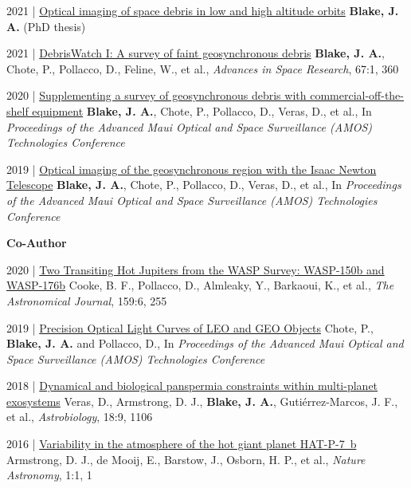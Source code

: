 \documentclass[10pt,a4paper]{altacv}
\begin{document}
\smallskip

\small
2021 | \href{https://www.researchgate.net/publication/355472603_Optical_imaging_of_space_debris_in_low_and_high_altitude_orbits}{Optical imaging of space debris in low and high altitude orbits}
\textbf{Blake, J. A.} (PhD thesis)

\smallskip

\small
2021 | \href{https://www.sciencedirect.com/science/article/abs/pii/S0273117720305664}{DebrisWatch I: A survey of faint geosynchronous debris}
\textbf{Blake, J. A.}, Chote, P., Pollacco, D., Feline, W., et al., \textit{Advances in Space Research}, 67:1, 360

\smallskip

\small
2020 | \href{https://www.researchgate.net/publication/344329639_Supplementing_a_survey_of_geosynchronous_debris_with_commercial-off-the-shelf_equipment}{Supplementing a survey of geosynchronous debris with commercial-off-the-shelf equipment}
\textbf{Blake, J. A.}, Chote, P., Pollacco, D., Veras, D., et al., In \textit{Proceedings of the Advanced Maui Optical and Space Surveillance (AMOS) Technologies Conference}

\smallskip

\small
2019 | \href{https://www.researchgate.net/publication/338337216_Optical_imaging_of_faint_geosynchronous_debris_with_the_Isaac_Newton_Telescope}{Optical imaging of the geosynchronous region with the Isaac Newton Telescope}
\textbf{Blake, J. A.}, Chote, P., Pollacco, D., Veras, D., et al., In \textit{Proceedings of the Advanced Maui Optical and Space Surveillance (AMOS) Technologies Conference}

\divider

\normalsize \textbf{Co-Author} 

\medskip

\small
2020 | \href{https://iopscience.iop.org/article/10.3847/1538-3881/ab88db/meta}{Two Transiting Hot Jupiters from the WASP Survey: WASP-150b and WASP-176b}
Cooke, B. F., Pollacco, D., Almleaky, Y., Barkaoui, K., et al., \textit{The Astronomical Journal}, 159:6, 255

\smallskip 

\small
2019 | \href{https://www.researchgate.net/publication/338450520_Precision_Optical_Light_Curves_of_LEO_and_GEO_Objects}{Precision Optical Light Curves of LEO and GEO Objects}
Chote, P., \linebreak\textbf{Blake, J. A.} and Pollacco, D., In \textit{Proceedings of the Advanced Maui Optical and Space Surveillance (AMOS) Technologies Conference}

\smallskip

\small
2018 | \href{https://www.liebertpub.com/doi/abs/10.1089/ast.2017.1786}{Dynamical and biological panspermia constraints within multi-planet exosystems}
Veras, D., Armstrong, D. J., \textbf{Blake, J. A.}, Guti{\'e}rrez-Marcos, J. F., et al., \textit{Astrobiology}, 18:9, 1106

\smallskip 

\small 
2016 | \href{https://www.nature.com/articles/s41550-016-0004}{Variability in the atmosphere of the hot giant planet HAT-P-7~b}
Armstrong, D. J., de Mooij, E., Barstow, J., Osborn, H. P., et al., \textit{Nature Astronomy}, 1:1, 1 
\end{document}
